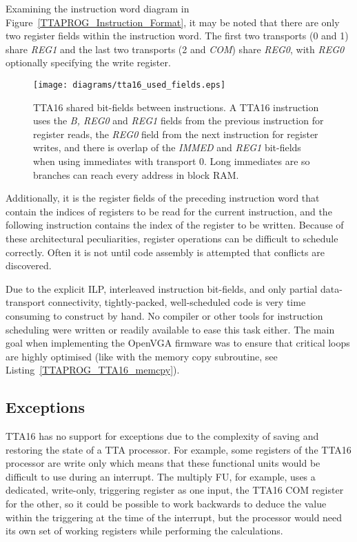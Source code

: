 Examining the instruction word diagram in
Figure~\ref{TTAPROG_Instruction_Format}, it may be noted that there are only two
register fields within the instruction word. The first two transports (0 and 1)
share \textit{REG1} and the last two transports (2 and \textit{COM}) share
\textit{REG0}, with \textit{REG0} optionally specifying the write register.

\begin{figure}[h!]
\begin{center}
\texttt{[image: diagrams/tta16\_used\_fields.eps]}
\caption[TTA16 instruction shared bit-fields]{TTA16 shared bit-fields between
instructions. A TTA16 instruction uses the \textit{B, REG0} and \textit{REG1}
fields from the previous instruction for register reads, the \textit{REG0}
field from the next instruction for register writes, and there is overlap of
the \textit{IMMED} and \textit{REG1} bit-fields when using immediates with
transport 0. Long immediates are so branches can reach every address in block RAM.}
\label{TTAPROG_Used_Fields}
\end{center}
\end{figure}

Additionally, it is the register fields of the preceding instruction word
that contain the indices of registers to be read for the current instruction,
and the following instruction contains the index of the register to be written.
Because of these architectural peculiarities, register operations can be
difficult to schedule correctly. Often it is not until code assembly is
attempted that conflicts are discovered.

Due to the explicit ILP, interleaved instruction bit-fields, and only partial
data-transport connectivity, tightly-packed, well-scheduled code is very time
consuming to construct by hand. No compiler or other tools for instruction
scheduling were written or readily available to ease this task either. The
main goal when implementing the OpenVGA firmware was to ensure that critical
loops are highly optimised (like with the memory copy subroutine, see
Listing~\ref{TTAPROG_TTA16_memcpy}).


\subsection{Exceptions}
TTA16 has no support for exceptions due to the complexity of saving and
restoring the state of a TTA processor. For example, some registers of the TTA16
processor are write only which means that these functional units would be
difficult to use during an interrupt. The multiply FU, for example, uses a
dedicated, write-only, triggering register as one input, the TTA16 COM register
for the other, so it could be possible to work backwards to deduce the value
within the triggering at the time of the interrupt, but the processor would
need its own set of working registers while performing the calculations.

